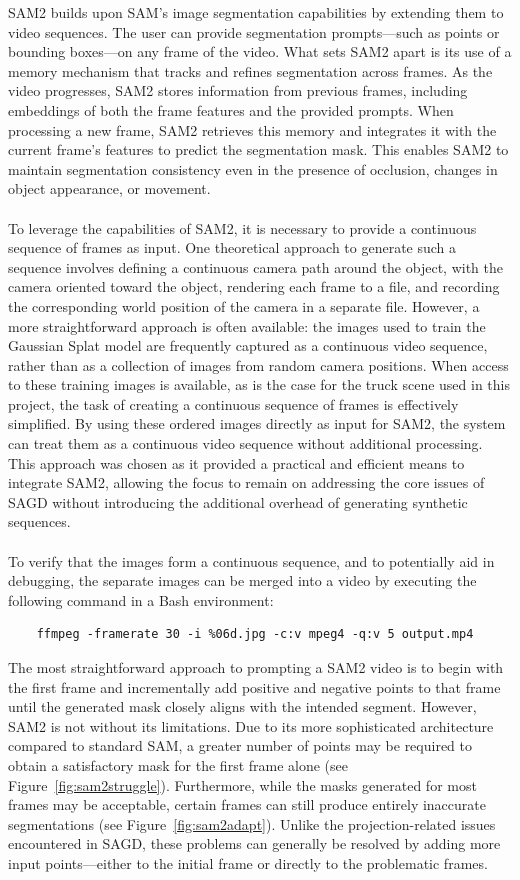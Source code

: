 \documentclass[12pt]{article}
\begin{document}
\FloatBarrier
\noindent
SAM2 builds upon SAM’s image segmentation capabilities by extending them to video sequences. The user can provide segmentation prompts—such as points or bounding boxes—on any frame of the video. What sets SAM2 apart is its use of a memory mechanism that tracks and refines segmentation across frames. As the video progresses, SAM2 stores information from previous frames, including embeddings of both the frame features and the provided prompts. When processing a new frame, SAM2 retrieves this memory and integrates it with the current frame’s features to predict the segmentation mask. This enables SAM2 to maintain segmentation consistency even in the presence of occlusion, changes in object appearance, or movement.
\\\\
To leverage the capabilities of SAM2, it is necessary to provide a continuous sequence of frames as input. One theoretical approach to generate such a sequence involves defining a continuous camera path around the object, with the camera oriented toward the object, rendering each frame to a file, and recording the corresponding world position of the camera in a separate file. However, a more straightforward approach is often available: the images used to train the Gaussian Splat model are frequently captured as a continuous video sequence, rather than as a collection of images from random camera positions. When access to these training images is available, as is the case for the truck scene used in this project, the task of creating a continuous sequence of frames is effectively simplified. By using these ordered images directly as input for SAM2, the system can treat them as a continuous video sequence without additional processing. This approach was chosen as it provided a practical and efficient means to integrate SAM2, allowing the focus to remain on addressing the core issues of SAGD without introducing the additional overhead of generating synthetic sequences.
\\\\
To verify that the images form a continuous sequence, and to potentially aid in debugging, the separate images can be merged into a video by executing the following command in a Bash environment:
\begin{verbatim}
	ffmpeg -framerate 30 -i %06d.jpg -c:v mpeg4 -q:v 5 output.mp4
\end{verbatim}
The most straightforward approach to prompting a SAM2 video is to begin with the first frame and incrementally add positive and negative points to that frame until the generated mask closely aligns with the intended segment. However, SAM2 is not without its limitations. Due to its more sophisticated architecture compared to standard SAM, a greater number of points may be required to obtain a satisfactory mask for the first frame alone (see Figure~\ref{fig:sam2struggle}). Furthermore, while the masks generated for most frames may be acceptable, certain frames can still produce entirely inaccurate segmentations (see Figure~\ref{fig:sam2adapt}). Unlike the projection-related issues encountered in SAGD, these problems can generally be resolved by adding more input points—either to the initial frame or directly to the problematic frames.
\end{document}
